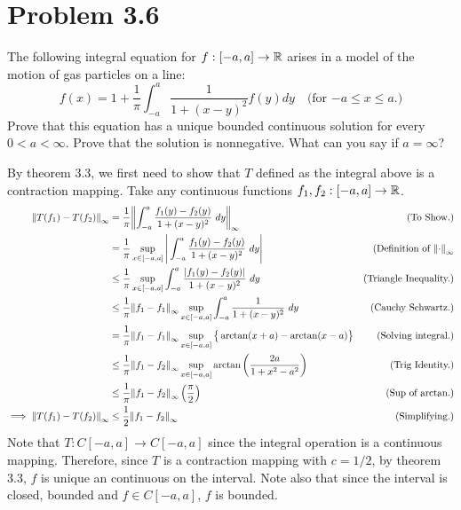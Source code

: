 \newpage
\section{Problem 3.6}
The following integral equation for $f: [-a, a] \rightarrow \mathbb{R}$ arises in a model of the motion of gas particles on a line:
\[f(x) = 1 + \frac{1}{\pi} \int_{-a}^a \frac{1}{1 + (x - y)^2}f(y)dy \quad \text{(for $-a \leq x \leq a.$)}\]
Prove that this equation has a unique bounded continuous solution for every $0 < a < \infty$. Prove that the solution is nonnegative. What can you say if $a = \infty$?
\partbreak
\begin{solution}

    By theorem 3.3, we first need to show that $T$ defined as the integral above is a contraction mapping. Take any continuous functions $f_1, f_2: [-a, a] \rightarrow \mathbb{R}$.
    \tightalignbreak
    \begin{align*}
        \norm{T(f_1) - T(f_2)}_\infty &= \frac{1}{\pi}\norm{\int_{-a}^a \frac{f_1(y) - f_2(y)}{1 + (x - y)^2}\ dy}_\infty &\text{(To Show.)}\\
        &= \frac{1}{\pi}\sup_{x \in [-a, a]} \Bigg|\int_{-a}^a \frac{f_1(y) - f_2(y)}{1 + (x - y)^2}\ dy \Bigg| &\text{(Definition of $\norm{\cdot}_\infty$}\\
        &\leq \frac{1}{\pi}\sup_{x \in [-a, a]} \int_{-a}^a \frac{|f_1(y) - f_2(y)|}{1 + (x - y)^2}\ dy &\text{(Triangle Inequality.)}\\
        &\leq \frac{1}{\pi} \norm{f_1 - f_1}_\infty \sup_{x \in [-a, a]}\int_{-a}^a \frac{1}{1 + (x - y)^2} \ dy &\text{(Cauchy Schwartz.)}\\
        & = \frac{1}{\pi}\norm{f_1 - f_1}_\infty \sup_{x \in [-a, a]} \big\{ \arctan(x + a) - \arctan(x - a)\big\} &\text{(Solving integral.)}\\
        &\leq \frac{1}{\pi}\norm{f_1 - f_2}_\infty\sup_{x \in [-a, a]} \arctan \left( \frac{2a}{1 + x^2 - a^2}\right) &\text{(Trig Identity.)}\\
        &\leq \frac{1}{\pi} \norm{f_1 - f_2}_\infty\left ( \frac{\pi}{2}\right) &\text{(Sup of arctan.)}\\
        \implies \norm{T(f_1) - T(f_2)}_\infty &\leq  \frac{1}{2} \norm{f_1 - f_2}_\infty &\text{(Simplifying.)}
    \end{align*}
    \vspace{-6mm}\alignbreak
    Note that $T: C[-a, a] \rightarrow C[-a, a]$ since the integral operation is a continuous mapping. Therefore, since $T$ is a contraction mapping with $c = 1/2$, by theorem 3.3, $f$ is unique an continuous on the interval. Note also that since the interval is closed, bounded and $f \in C[-a, a]$, $f$ is bounded. \par

\end{solution}
